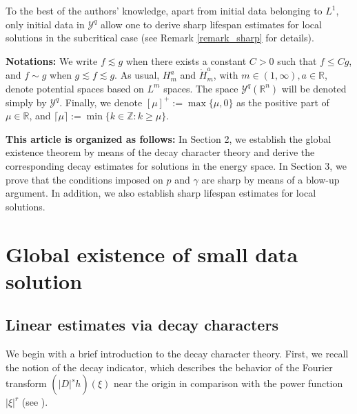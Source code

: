 \documentclass[11pt,reqno]{amsart}
\begin{document}
To the best of the authors' knowledge, apart from initial data belonging to $L^1$, only initial data in $\mathcal{Y}^q$ allow one to derive sharp lifespan estimates for local solutions in the subcritical case (see Remark \ref{remark_sharp} for details).

\vspace{0.3cm}
\noindent \textbf{Notations:}   We write $f\lesssim g$ when there exists a constant $C>0$ such that $f\le Cg$, and $f \sim g$ when $g\lesssim f\lesssim g$. As usual, $H^{a}_m$ and $\dot{H}^{a}_m$, with $m \in (1, \infty), a \in \mathbb{R}$, denote potential spaces based on $L^m$ spaces. The space $\mathcal{Y}^q(\mathbb{R}^n)$ will be denoted simply by $\mathcal{Y}^q$. Finally, we denote $[\mu]^+
 := \max\{\mu, 0\}$ as the positive part of $\mu \in \mathbb{R}$, and 	$\lceil\mu \rceil
 := \min\{k \in \mathbb{Z} : k \geq \mu\}$.

\vspace{0.3cm}
\noindent \textbf{This article is organized as follows:} In Section 2, we establish the global existence theorem by means of the decay character theory and derive the corresponding decay estimates for solutions in the energy space. In Section 3, we prove that the conditions imposed on $p$ and $\gamma$ are sharp by means of a blow-up argument. In addition, we also establish sharp lifespan estimates for local solutions.



\section{Global existence of small data solution}\label{Section_GESDS}

\subsection{Linear estimates via decay characters}\label{Section_Linear}
We begin with a brief introduction to the decay character theory. First, we recall the notion of the decay indicator, which describes the behavior of the Fourier transform $(\widehat{|D|^s h})(\xi)$ near the origin in comparison with the power function $|\xi|^r$ (see \cite{Bjorland2009}). 
\end{document}
